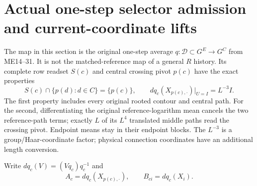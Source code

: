 \documentclass[11pt,letterpaper]{article}
\theoremstyle{plain}
\theoremstyle{remark}\newtheorem{remark}[theorem]{Scope}
\begin{document}
\section{Actual one-step selector admission and current-coordinate lifts}
\label{sec:mixed}

The map in this section is the original one-step average $q:\mathcal D\subset
G^E\to G^C$ from ME14--31. It is not the matched-reference map of a general
$R$ history. Its complete row readset $S(c)$ and central crossing pivot $p(c)$
have the exact properties
\begin{equation}
S(c)\cap\{p(d):d\in C\}=\{p(c)\},\qquad
dq_c(X_{p(c),\cdot})\big|_{U=I}=L^{-3}I.
\label{eq:pivotinput}
\end{equation}
The first property includes every original rooted contour and central path.
For the second, differentiating the original reference-logarithm mean cancels
the two reference-path terms; exactly $L$ of its $L^4$ translated middle paths
read the crossing pivot. Endpoint means stay in their endpoint blocks. The
$L^{-3}$ is a group/Haar-coordinate factor; physical connection coordinates
have an additional length conversion.

Write $dq_c(V)=(Vq_c)q_c^{-1}$ and
\begin{equation}
A_c=dq_c(X_{p(c),\cdot}),\qquad B_{ci}=dq_c(X_i).
\label{eq:AB}
\end{equation}
\end{document}
